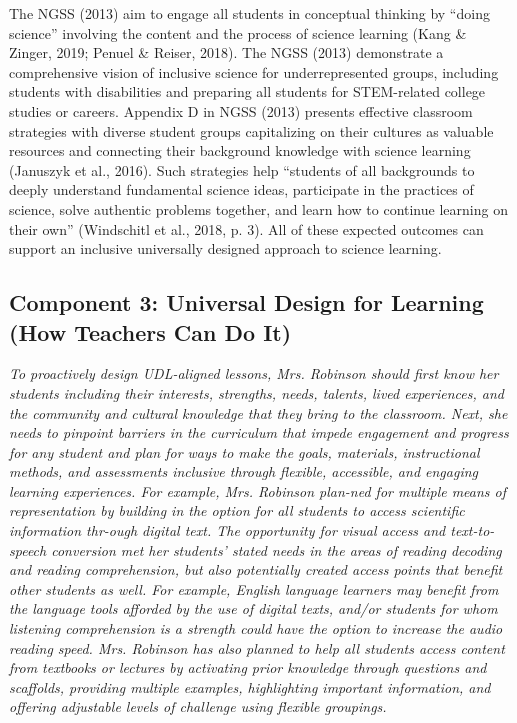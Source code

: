 \documentclass[11.5pt]{sig-alternate}
\begin{document}
\begin{large}
 The NGSS (2013) aim to engage all students in conceptual thinking by “doing science” involving the content and the process of science learning (Kang \& Zinger, 2019; Penuel \& Reiser, 2018). The NGSS (2013) demonstrate a comprehensive vision of inclusive science for underrepresented groups, including students with disabilities and preparing all students for STEM-related college studies or careers. Appendix D in NGSS (2013) presents effective classroom strategies with diverse student groups capitalizing on their cultures as valuable resources and connecting their background knowledge with science learning (Januszyk et al., 2016). Such strategies help “students of all backgrounds to deeply understand fundamental science ideas, participate in the practices of science, solve authentic problems together, and learn how to continue learning on their own” (Windschitl et al., 2018, p. 3). All of these expected outcomes can support an inclusive universally designed approach to science learning.

\subsection*{Component 3: Universal Design for Learning (How Teachers Can Do It) }

\textit{To proactively design UDL-aligned lessons, Mrs. Robinson should first know her students including their interests, strengths, needs, talents, lived experiences, and the community and cultural knowledge that they bring to the classroom. Next, she needs to pinpoint barriers in the curriculum that impede engagement and progress for any student and plan for ways to make the goals, materials, instructional methods, and assessments inclusive through flexible, accessible, and engaging learning experiences. For example, Mrs. Robinson plan-ned for multiple means of representation by building in the option for all students to access scientific information thr-ough digital text. The opportunity for visual access and text-to-speech conversion met her students' stated needs in the areas of reading decoding and reading comprehension, but also potentially created access points that benefit other students as well. For example, English language learners may benefit from the language tools afforded by the use of digital texts, and/or students for whom listening comprehension is a strength could have the option to increase the audio reading speed. Mrs. Robinson has also planned to help all students access content from textbooks or lectures by activating prior knowledge through questions and scaffolds, providing multiple examples, highlighting important information, and offering adjustable levels of challenge using flexible groupings.}


\end{large}
\end{document}
